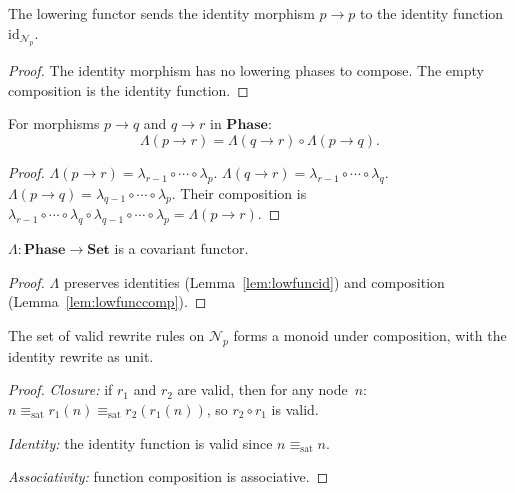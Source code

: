 \documentclass[11pt]{article}
\begin{document}
\begin{lemma}%
\label{lem:lowfuncid}
The lowering functor sends the identity morphism $p \to p$
to the identity function $\mathrm{id}_{\mathcal{N}_p}$.
\end{lemma}
\begin{proof}
The identity morphism has no lowering phases to compose.
The empty composition is the identity function.
\end{proof}

\begin{lemma}%
\label{lem:lowfunccomp}
For morphisms $p \to q$ and $q \to r$ in $\mathbf{Phase}$:
\[
  \Lambda(p \to r) = \Lambda(q \to r) \circ \Lambda(p \to q).
\]
\end{lemma}
\begin{proof}
$\Lambda(p \to r) = \lambda_{r-1} \circ \cdots \circ \lambda_p$.
$\Lambda(q \to r) = \lambda_{r-1} \circ \cdots \circ \lambda_q$.
$\Lambda(p \to q) = \lambda_{q-1} \circ \cdots \circ \lambda_p$.
Their composition is
$\lambda_{r-1} \circ \cdots \circ \lambda_q \circ
\lambda_{q-1} \circ \cdots \circ \lambda_p = \Lambda(p \to r)$.
\end{proof}

\begin{corollary}\label{cor:lambdafunc}
$\Lambda \colon \mathbf{Phase} \to \mathbf{Set}$ is a covariant
functor.
\end{corollary}
\begin{proof}
$\Lambda$ preserves identities (Lemma~\ref{lem:lowfuncid})
and composition (Lemma~\ref{lem:lowfunccomp}).
\end{proof}

\begin{lemma}%
\label{lem:rewritemonoid}
The set of valid rewrite rules on $\mathcal{N}_p$ forms a
monoid under composition, with the identity rewrite as unit.
\end{lemma}
\begin{proof}
\emph{Closure:} if $r_1$ and $r_2$ are valid, then for any
node~$n$: $n \equiv_{\mathrm{sat}} r_1(n) \equiv_{\mathrm{sat}}
r_2(r_1(n))$, so $r_2 \circ r_1$ is valid.

\emph{Identity:} the identity function is valid since
$n \equiv_{\mathrm{sat}} n$.

\emph{Associativity:} function composition is associative.
\end{proof}
\end{document}
